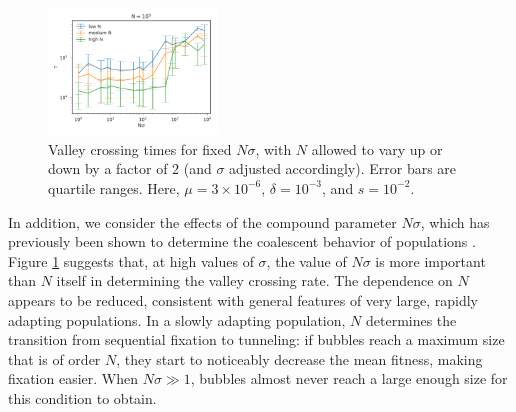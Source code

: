 \documentclass[rmp]{revtex4}
\begin{document}
\begin{figure}
\includegraphics[width=0.4\textwidth]{Figures/bands.pdf}
\caption{Valley crossing times for fixed $N\sigma$, with $N$ allowed to vary up or down by a factor of $2$ (and $\sigma$ adjusted accordingly). Error bars are quartile ranges. Here, $\mu = 3 \times 10^{-6}$, $\delta = 10^{-3}$, and $s = 10^{-2}$.}
\label{fig:bands}
\end{figure}

In addition, we consider the effects of the compound parameter $N\sigma$, which has previously been shown to determine the coalescent behavior of populations \citep{neher_hallatschek_2013, neher_kessinger_2013}.
Figure \ref{fig:bands} suggests that, at high values of $\sigma$, the value of $N\sigma$ is more important than $N$ itself in determining the valley crossing rate.
The dependence on $N$ appears to be reduced, consistent with general features of very large, rapidly adapting populations.
In a slowly adapting population, $N$ determines the transition from sequential fixation to tunneling: if bubbles reach a maximum size that is of order $N$, they start to noticeably decrease the mean fitness, making fixation easier.
When $N\sigma \gg 1$, bubbles almost never reach a large enough size for this condition to obtain.
\end{document}
